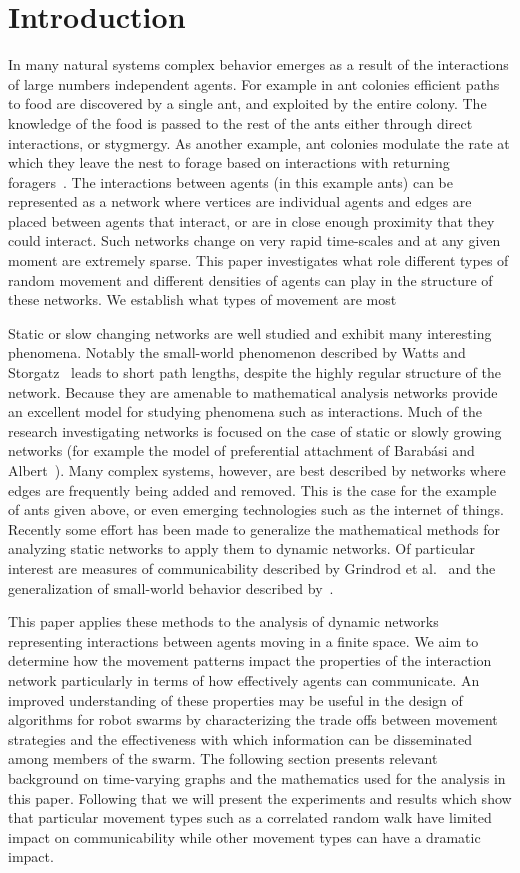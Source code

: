\documentclass[conference]{IEEEtran}
\begin{document}
\section{Introduction}
In many natural systems complex behavior emerges as a result of the
interactions of large numbers independent agents. For example in ant
colonies efficient paths to food are discovered by a single ant, and
exploited by the entire colony. The knowledge of the food is passed to
the rest of the ants either through direct interactions, or
stygmergy. As another example, ant colonies modulate the rate at which
they leave the nest to forage based on interactions with returning
foragers~\cite{Pinter2013}. The interactions between agents (in this
example ants) can be represented as a network where vertices are
individual agents and edges are placed between agents that interact,
or are in close enough proximity that they could interact. Such
networks change on very rapid time-scales and at any given moment are
extremely sparse. This paper investigates what role different types of
random movement and different densities of agents can play in the
structure of these networks. We establish what types of movement are
most 

Static or slow changing networks are well studied and exhibit many
interesting phenomena. Notably the small-world phenomenon described by
Watts and Storgatz~\cite{Watts1998} leads to short path lengths,
despite the highly regular structure of the network. Because they are
amenable to mathematical analysis networks provide an excellent model
for studying phenomena such as interactions. Much of the research
investigating networks is focused on the case of static or slowly
growing networks (for example the model of preferential attachment of
Barab\'asi and Albert~\cite{Barabasi1999}). Many complex systems,
however, are best described by networks where edges are frequently
being added and removed. This is the case for the example of ants
given above, or even emerging technologies such as the internet of
things. Recently some effort has been made to generalize the
mathematical methods for analyzing static networks to apply them to
dynamic networks. Of particular interest are measures of
communicability described by Grindrod et al.~\cite{Grindrod2011} and
the generalization of small-world behavior described
by~\cite{Tang2010}.

This paper applies these methods to the analysis of dynamic networks
representing interactions between agents moving in a finite space. We
aim to determine how the movement patterns impact the properties of
the interaction network particularly in terms of how effectively
agents can communicate. An improved understanding of these properties
may be useful in the design of algorithms for robot swarms by
characterizing the trade offs between movement strategies and the
effectiveness with which information can be disseminated among members
of the swarm. The following section presents relevant background on
time-varying graphs and the mathematics used for the analysis in this
paper. Following that we will present the experiments and results
which show that particular movement types such as a correlated random
walk have limited impact on communicability while other movement types
can have a dramatic impact.
\end{document}
